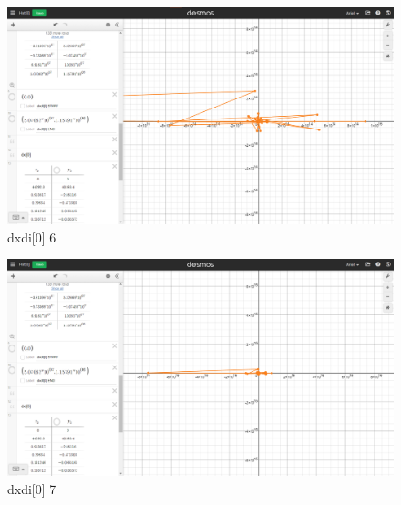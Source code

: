\begin{figure}[H]
    \includegraphics[width=\columnwidth]{figs/dxdi[0]_6}
    \caption{dxdi[0] 6}
\end{figure}
\begin{figure}[H]
    \includegraphics[width=\columnwidth]{figs/dxdi[0]_7}
    \caption{dxdi[0] 7}
\end{figure}

